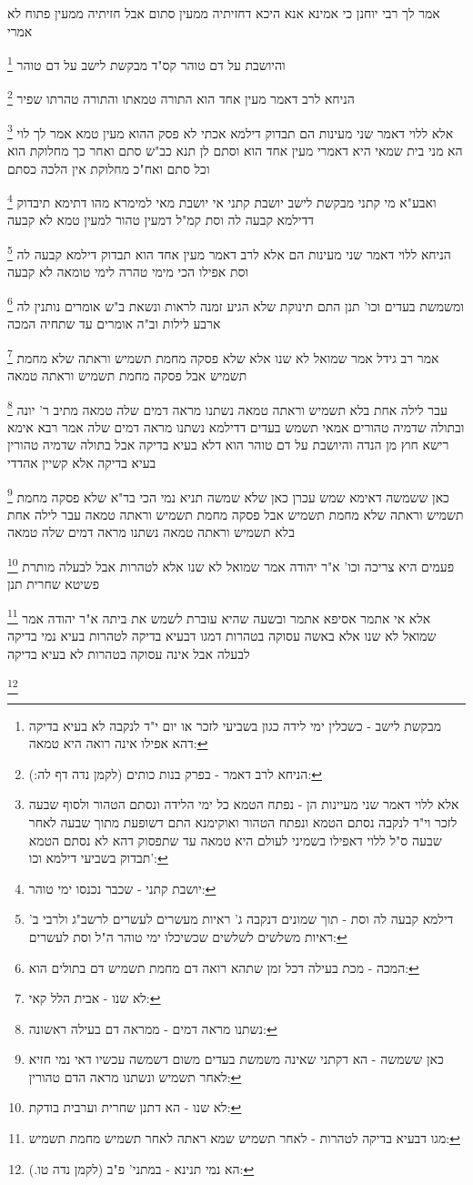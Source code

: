 \documentclass[12pt, openany]{book}
\newcommand{\footnotecomment}[1]{
	\renewcommand\thefootnote{}
	\footnote{#1}}
\newcommand{\commenta}[1]{\footnotecomment{#1}}
\begin{document}
{{ אמר לך רבי יוחנן כי אמינא אנא היכא דחזיתיה ממעין סתום אבל חזיתיה ממעין פתוח לא אמרי
\commenta{מבקשת לישב - כשכלין ימי לידה כגון בשביעי לזכר או יום י"ד לנקבה לא בעיא בדיקה דהא אפילו אינה רואה היא טמאה:}
והיושבת על דם טוהר קס"ד מבקשת לישב על דם טוהר 
\commenta{הניחא לרב דאמר - בפרק בנות כותים (לקמן נדה דף לה:):}
הניחא לרב דאמר מעין אחד הוא התורה טמאתו והתורה טהרתו שפיר
\commenta{אלא ללוי דאמר שני מעיינות הן - נפתח הטמא כל ימי הלידה ונסתם הטהור ולסוף שבעה לזכר וי"ד לנקבה נסתם הטמא ונפתח הטהור ואוקימנא התם דשופעת מתוך שבעה לאחר שבעה ס"ל ללוי דאפילו בשמיני לעולם היא טמאה עד שתפסוק דהא לא נסתם הטמא תבדוק בשביעי דילמא וכו':}
אלא ללוי דאמר שני מעינות הם תבדוק דילמא אכתי לא פסק ההוא מעין טמא אמר לך לוי הא מני
בית שמאי היא דאמרי מעין אחד הוא וסתם לן תנא כב"ש סתם ואחר כך מחלוקת הוא וכל סתם ואח"כ מחלוקת אין הלכה כסתם 
\commenta{יושבת קתני - שכבר נכנסו ימי טוהר:}
ואבע"א מי קתני מבקשת לישב יושבת קתני אי יושבת מאי למימרא מהו דתימא תיבדוק דדילמא קבעה לה וסת קמ"ל דמעין טהור למעין טמא לא קבעה 
\commenta{דילמא קבעה לה וסת - תוך שמונים דנקבה ג' ראיות מעשרים לעשרים לרשב"ג ולרבי ב' ראיות משלשים לשלשים שכשיכלו ימי טוהר ה"ל וסת לעשרים:}
הניחא ללוי דאמר שני מעינות הם אלא לרב דאמר מעין אחד הוא תבדוק דילמא קבעה לה וסת אפילו הכי מימי טהרה לימי טומאה לא קבעה
\commenta{המכה - מכת בעילה דכל זמן שתהא רואה דם מחמת תשמיש דם בתולים הוא:}
ומשמשת בעדים וכו' תנן התם תינוקת שלא הגיע זמנה לראות ונשאת ב"ש אומרים נותנין לה ארבע לילות וב"ה אומרים עד שתחיה המכה 
\commenta{לא שנו - אבית הלל קאי:}
אמר רב גידל אמר שמואל לא שנו אלא שלא פסקה מחמת תשמיש וראתה שלא מחמת תשמיש אבל פסקה מחמת תשמיש וראתה טמאה 
\commenta{נשתנו מראה דמים - ממראה דם בעילה ראשונה:}
עבר לילה אחת בלא תשמיש וראתה טמאה נשתנו מראה דמים שלה טמאה מתיב ר' יונה ובתולה שדמיה טהורים אמאי תשמש בעדים דדילמא נשתנו מראה דמים שלה 
אמר רבא אימא רישא חוץ מן הנדה והיושבת על דם טוהר הוא דלא בעיא בדיקה אבל בתולה שדמיה טהורין בעיא בדיקה אלא קשיין אהדדי 
\commenta{כאן ששמשה - הא דקתני שאינה משמשת בעדים משום דשמשה עכשיו דאי נמי חזיא לאחר תשמיש ונשתנו מראה הדם טהורין:}
כאן ששמשה דאימא שמש עכרן כאן שלא שמשה 
תניא נמי הכי בד"א שלא פסקה מחמת תשמיש וראתה שלא מחמת תשמיש
אבל פסקה מחמת תשמיש וראתה טמאה עבר לילה אחת בלא תשמיש וראתה טמאה נשתנו מראה דמים שלה טמאה 
\commenta{לא שנו - הא דתנן שחרית וערבית בודקת:}
פעמים היא צריכה וכו' א"ר יהודה אמר שמואל לא שנו אלא לטהרות אבל לבעלה מותרת פשיטא שחרית תנן 
\commenta{מגו דבעיא בדיקה לטהרות - לאחר תשמיש שמא ראתה לאחר תשמיש מחמת תשמיש:}
אלא אי אתמר אסיפא אתמר ובשעה שהיא עוברת לשמש את ביתה א"ר יהודה אמר שמואל לא שנו אלא באשה עסוקה בטהרות דמגו דבעיא בדיקה לטהרות בעיא נמי בדיקה לבעלה אבל אינה עסוקה בטהרות לא בעיא בדיקה 
\commenta{הא נמי תנינא - במתני' פ"ב (לקמן נדה טו.):}
}}
\end{document}
